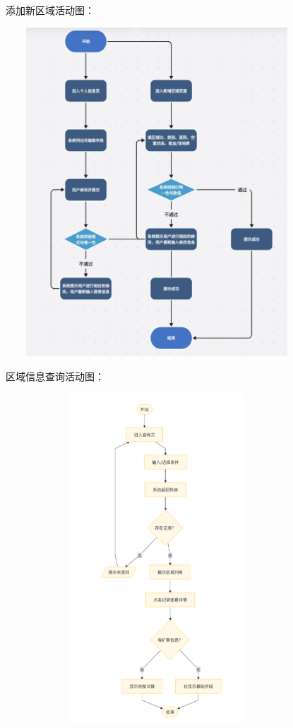 \documentclass[]{article}
\let\oldincludegraphics\includegraphics
\renewcommand{\includegraphics}[2][]{%
  \begin{center}\oldincludegraphics[#1]{#2}\end{center}%
}
\begin{document}
添加新区域活动图：

\includegraphics[width=4.45694in,height=4.83819in]{media/media/image_2-3-1.png}

区域信息查询活动图：

\includegraphics[width=4.45694in,height=4.83819in]{media/media/image_2-3-2.png}
\end{document}
